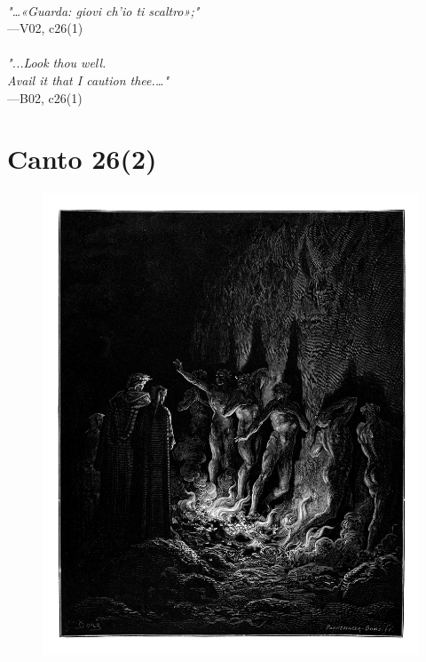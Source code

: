 \documentclass[../Dore_vision.tex]{subfiles}
\begin{document}
\begin{center}
\begin{minipage}{0.8\linewidth}
\textit{\\
"…«Guarda: giovi ch’io ti scaltro»;"} \\
—V02, c26(1) \\~\\
\textit{"...\textquotesingle Look thou well.\\Avail it that I caution thee.\textquotesingle…"} \\
—B02, c26(1)
\end{minipage}
\end{center}

\newpage

\section{Canto 26(2)}

\begin{figure}[ht]
\centering
\includegraphics[height=\figsize]{illustrations/book_2/V02, c26(2).jpg}
\end{figure}
\end{document}
